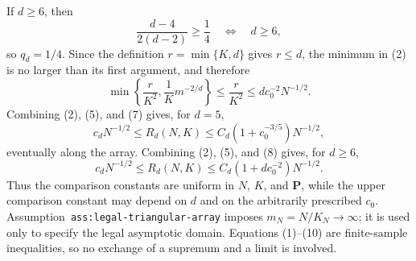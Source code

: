 If \(d\ge6\), then
\[
\frac{d-4}{2(d-2)}\ge\frac14
\quad\Longleftrightarrow\quad d\ge6,
\]
so \(q_d=1/4\).  Since the definition \(r=\min\{K,d\}\) gives \(r\le d\), the minimum in (2) is no larger than its first argument, and therefore
\[
\min\left\{\frac r{K^2},\frac1K m^{-2/d}\right\}
\le\frac r{K^2}
\le d c_0^{-2}N^{-1/2}.
\tag{8}
\]
Combining (2), (5), and (7) gives, for \(d=5\),
\[
c_dN^{-1/2}\le R_d(N,K)
\le C_d(1+c_0^{-3/5})N^{-1/2},
\tag{9}
\]
eventually along the array.  Combining (2), (5), and (8) gives, for \(d\ge6\),
\[
c_dN^{-1/2}\le R_d(N,K)
\le C_d(1+d c_0^{-2})N^{-1/2}.
\tag{10}
\]
Thus the comparison constants are uniform in \(N\), \(K\), and \(\mathbf P\), while the upper comparison constant may depend on \(d\) and on the arbitrarily prescribed \(c_0\).  Assumption~\texttt{ass:legal-triangular-array} imposes \(m_N=N/K_N\to\infty\); it is used only to specify the legal asymptotic domain.  Equations (1)--(10) are finite-sample inequalities, so no exchange of a supremum and a limit is involved.

